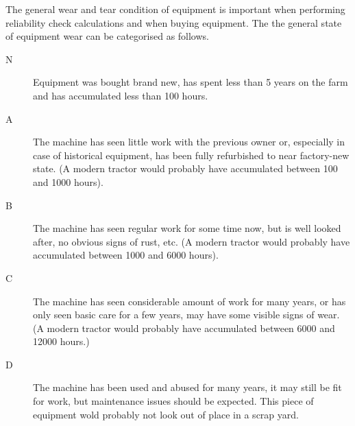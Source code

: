 \documentclass[a4paper,10pt]{article}
\begin{document}
The general wear and tear condition of equipment is important when performing
reliability check calculations and when buying equipment. The the general state
of equipment wear can be categorised as follows.
\begin{description}
\item[N] Equipment was bought brand new, has spent less than 5 years on the
  farm and has accumulated less than 100 hours.
\item[A] The machine has seen little work with the previous owner or,
  especially in case of historical equipment, has been fully refurbished to near
  factory-new state. (A modern tractor would probably have accumulated between
  100 and 1000 hours).
\item[B] The machine has seen regular work for some time now, but is well
  looked after, no obvious signs of rust, etc. (A modern tractor would probably
  have accumulated between 1000 and 6000 hours).
\item[C] The machine has seen considerable amount of work for many years, or
  has only seen basic care for a few years, may have some visible signs of wear.
  (A modern tractor would probably have accumulated between 6000 and 12000
  hours.)
\item[D] The machine has been used and abused for many years, it may still be
  fit for work, but maintenance issues should be expected. This piece of
  equipment wold probably not look out of place in a scrap yard.
\end{description}%
%
\end{document}
